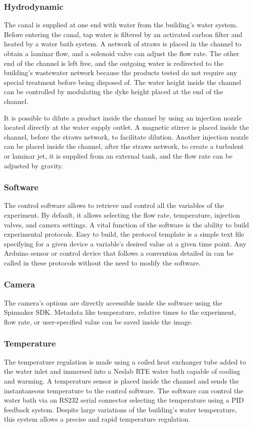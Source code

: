   \subsubsection{Hydrodynamic}
  The canal is supplied at one end with water from the building's water system. Before entering the canal, tap water is filtered by an activated carbon filter and heated by a water bath system. A network of straws is placed in the channel to obtain a laminar flow, and a solenoid valve can adjust the flow rate. The other end of the channel is left free, and the outgoing water is redirected to the building's wastewater network because the products tested do not require any special treatment before being disposed of. The water height inside the channel can be controlled by modulating the dyke height placed at the end of the channel.

  It is possible to dilute a product inside the channel by using an injection nozzle located directly at the water supply outlet. A magnetic stirrer is placed inside the channel, before the straws network, to facilitate dilution. Another injection nozzle can be placed inside the channel, after the straws network, to create a turbulent or laminar jet, it is supplied from an external tank, and the flow rate can be adjusted by gravity.


  \subsubsection{Software}
  The control software allows to retrieve and control all the variables of the experiment. By default, it allows selecting the flow rate, temperature, injection valves, and camera settings. A vital function of the software is the ability to build experimental protocols. Easy to build, the protocol template is a simple text file specifying for a given device a variable's desired value at a given time point. Any Arduino sensor or control device that follows a convention detailed in \url{} can be called in these protocols without the need to modify the software.

  \subsubsection{Camera}
  The camera's options are directly accessible inside the software using the Spinnaker SDK. Metadata like temperature, relative times to the experiment, flow rate, or user-specified value can be saved inside the image.

  \subsubsection{Temperature}
  The temperature regulation is made using a coiled heat exchanger tube added to the water inlet and immersed into a Neslab RTE water bath capable of cooling and warming. A temperature sensor is placed inside the channel and sends the instantaneous temperature to the control software. The software can control the water bath via an RS232 serial connector selecting the temperature using a PID \cite{} feedback system. Despite large variations of the building's water temperature, this system allows a precise and rapid temperature regulation.

